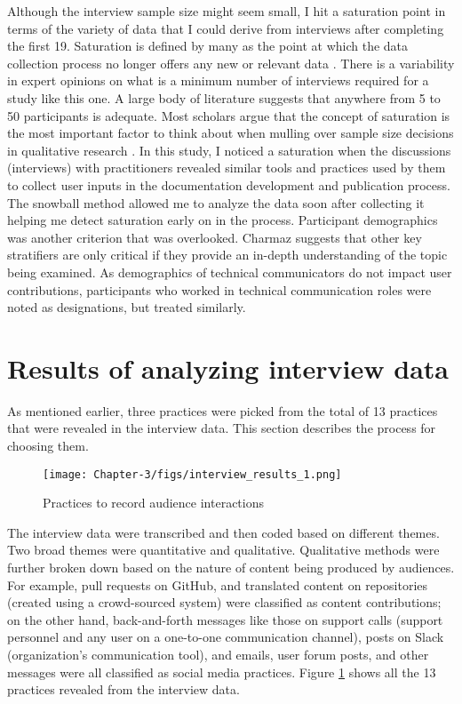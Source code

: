 Although the interview sample size might seem small, I hit a saturation point in terms of the variety of data that I could derive from interviews after completing the first 19. Saturation is defined by many as the point at which the data collection process no longer offers any new or relevant data \cite{dworkin2012sample}. There is a variability in expert opinions on what is a minimum number of interviews required for a study like this one. A large body of literature suggests that anywhere from 5 to 50 participants is adequate. Most scholars argue that the concept of saturation is the most important factor to think about when mulling over sample size decisions in qualitative research \cite{charmaz2006constructing, dworkin2012sample}. In this study, I noticed a saturation when the discussions (interviews) with practitioners revealed similar tools and practices used by them to collect user inputs in the documentation development and publication process. The snowball method allowed me to analyze the data soon after collecting it helping me detect saturation early on in the process. Participant demographics was another criterion that was overlooked. Charmaz \cite{charmaz2006constructing} suggests that other key stratifiers are only critical if they provide an in-depth understanding of the topic being examined. As demographics of technical communicators do not impact user contributions, participants who worked in technical communication roles were noted as designations, but treated similarly.

\section{Results of analyzing interview data}
As mentioned earlier, three practices were picked from the total of 13 practices that were revealed in the interview data. This section describes the process for choosing them.

\begin{figure}[t]
  \begin{center}
      \texttt{[image: Chapter-3/figs/interview\_results\_1.png]}
  \end{center}
  \caption{Practices to record audience interactions}
  \label{fig:ch3.1}
\end{figure}

The interview data were transcribed and then coded based on different themes. Two broad themes were quantitative and qualitative. Qualitative methods were further broken down based on the nature of content being produced by audiences. For example, pull requests on GitHub, and translated content on repositories (created using a crowd-sourced system) were classified as content contributions; on the other hand, back-and-forth messages like those on support calls (support personnel and any user on a one-to-one communication channel), posts on Slack (organization’s communication tool), and emails, user forum posts, and other messages were all classified as social media practices. Figure \ref{fig:ch3.1} shows all the 13 practices revealed from the interview data.

